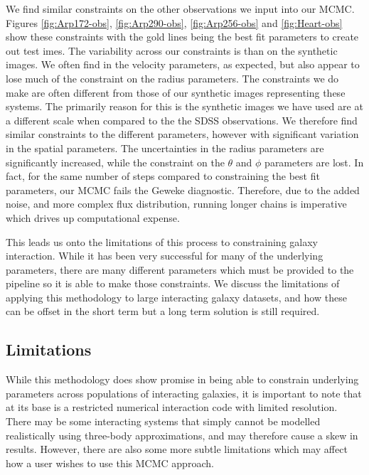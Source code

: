 We find similar constraints on the other observations we input into our MCMC. Figures \ref{fig:Arp172-obs}, \ref{fig:Arp290-obs}, \ref{fig:Arp256-obs} and \ref{fig:Heart-obs} show these constraints with the gold lines being the best fit parameters to create out test imes. The variability across our constraints is \DIFdelbegin {}\DIFdelend \DIFaddbegin {}\DIFaddend than on the synthetic images. We often find \DIFdelbegin {}\DIFdelend \DIFaddbegin {}\DIFaddend in the velocity parameters, as expected, but also appear to lose much of the constraint on the radius parameters. The constraints we do make are often different from those of our synthetic images representing these systems. The primarily reason for this is the synthetic images we have used are at a different scale when compared to the the SDSS observations. We therefore find similar constraints to the different parameters, however with significant variation in the spatial parameters. The uncertainties in the radius parameters are significantly increased, while the constraint on the $\theta$ and $\phi$ parameters are lost. In fact, for the same number of steps compared to constraining the best fit parameters, our MCMC fails the Geweke diagnostic. Therefore, due to the added noise, and more complex flux distribution, running longer chains is imperative which drives up computational expense.

This leads us onto the limitations of this process to constraining galaxy interaction. While it has been very successful for many of the underlying parameters, there are many different parameters which must be provided to the pipeline so it is able to make those constraints. We discuss the limitations of applying this methodology to large interacting galaxy datasets, and how these can be offset in the short term but a long term solution is still required.

\subsection{Limitations}\label{limitations}
\noindent While this methodology does show promise in being able to constrain underlying parameters across populations of interacting galaxies, it is important to note that at its base is a restricted numerical interaction code with limited resolution. There may be some interacting systems that simply cannot be modelled realistically using three-body approximations, and may therefore cause a skew in results. However, there are also some more subtle limitations which may affect how a user wishes to use this MCMC approach.

